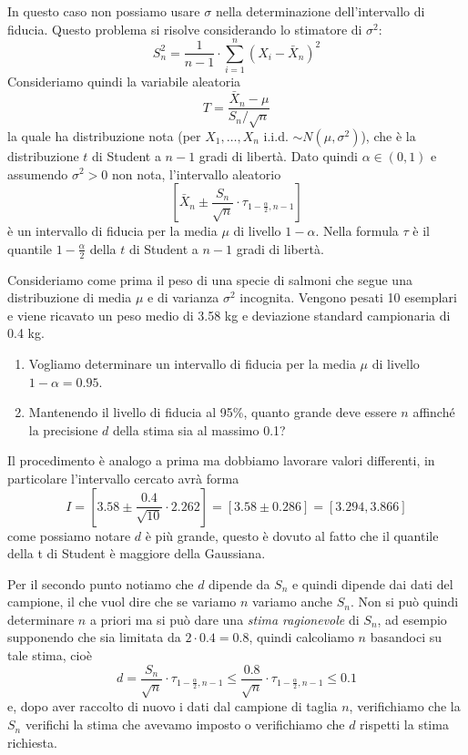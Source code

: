 \begin{proposition}
	In questo caso non possiamo usare $\sigma$ nella determinazione dell'intervallo di fiducia.
	Questo problema si risolve considerando lo stimatore di $\sigma^2$:
	\[ S_n^2 = \frac{1}{n-1} \cdot \sum_{i=1}^n \left( X_i - \bar{X}_n \right)^2 \]
	Consideriamo quindi la variabile aleatoria
	\[ T = \frac{\bar{X}_n - \mu}{S_n / \sqrt{n}} \]
	la quale ha distribuzione nota (per $X_1, \dots, X_n$ i.i.d. $\sim N(\mu, \sigma^2)$), che è la
	distribuzione $t$ di Student a $n-1$ gradi di libertà. Dato quindi $\alpha \in (0,1)$ e
	assumendo $\sigma^2 > 0$ non nota, l'intervallo aleatorio
	\[
		\left[ \bar{X}_n \pm
			\frac{S_n}{\sqrt{n}} \cdot \tau_{1 - \frac{\alpha}{2}, n-1} \right]
	\]
	è un intervallo di fiducia per la media $\mu$ di livello $1-\alpha$. Nella formula $\tau$ è il
	quantile $1-\frac{\alpha}{2}$ della $t$ di Student a $n-1$ gradi di libertà.
\end{proposition}

\begin{example}
	Consideriamo come prima il peso di una specie di salmoni che segue una distribuzione di media
	$\mu$ e di varianza $\sigma^2$ incognita. Vengono pesati 10 esemplari e viene ricavato un peso
	medio di 3.58 kg e deviazione standard campionaria di 0.4 kg.
	\begin{enumerate}
		\item Vogliamo determinare un intervallo di fiducia per la media $\mu$ di livello
		      $1 - \alpha = 0.95$.
		\item Mantenendo il livello di fiducia al 95\%, quanto grande deve essere $n$ affinché la
		      precisione $d$ della stima sia al massimo 0.1?
	\end{enumerate}
	Il procedimento è analogo a prima ma dobbiamo lavorare valori differenti, in particolare
	l'intervallo cercato avrà forma
	\[
		I = \left[ 3.58 \pm \frac{0.4}{\sqrt{10}} \cdot 2.262 \right]
		= [3.58 \pm 0.286] = [3.294, 3.866]
	\]
	come possiamo notare $d$ è più grande, questo è dovuto al fatto che il quantile della t di
	Student è maggiore della Gaussiana.

	Per il secondo punto notiamo che $d$ dipende da $S_n$ e quindi dipende dai dati del campione,
	il che vuol dire che se variamo $n$ variamo anche $S_n$. Non si può quindi determinare $n$ a
	priori ma si può dare una \emph{stima ragionevole} di $S_n$, ad esempio supponendo che sia
	limitata da $2 \cdot 0.4 = 0.8$, quindi calcoliamo $n$ basandoci su tale stima, cioè
	\[
		d = \frac{S_n}{\sqrt{n}} \cdot \tau_{1 - \frac{\alpha}{2}, n-1} \leq
		\frac{0.8}{\sqrt{n}} \cdot \tau_{1 - \frac{\alpha}{2}, n-1} \leq 0.1
	\]
	e, dopo aver raccolto di nuovo i dati dal campione di taglia $n$, verifichiamo che la $S_n$
	verifichi la stima che avevamo imposto o verifichiamo che $d$ rispetti la stima richiesta.
\end{example}

